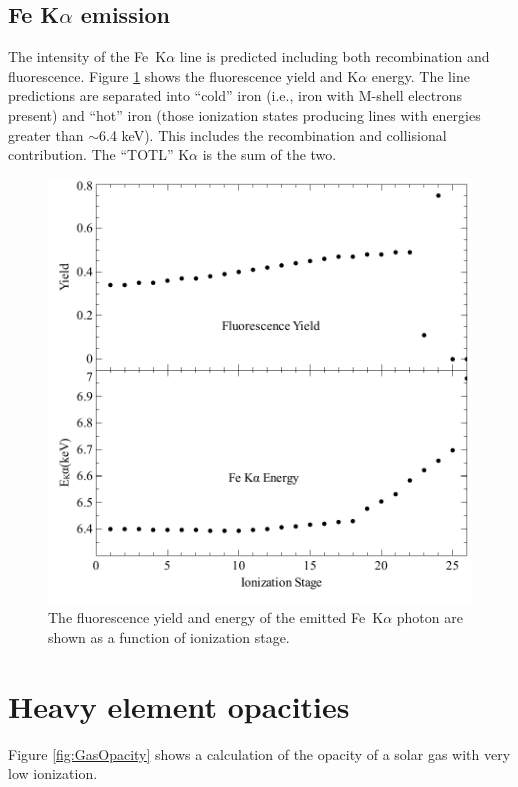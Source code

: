 \subsection{Fe K$\alpha$ emission}

The intensity of the Fe~K$\alpha$ line is predicted including both recombination
and fluorescence.  Figure \ref{fig:FeKalpha} shows the fluorescence yield and
K$\alpha$ energy.
The line predictions are separated into ``cold'' iron (i.e., iron with
M-shell electrons present) and ``hot'' iron (those ionization states
producing lines with energies greater than $\sim$6.4 keV).  This includes the
recombination and collisional contribution.  The ``TOTL'' K$\alpha$ is the sum of
the two.

\begin{figure}
\centering
\label{fig:FeKalpha}
\includegraphics[scale=0.8]{FeKalpha}
\caption[Fe~K$\alpha$ yield and energy]{The fluorescence yield and energy of the emitted Fe~K$\alpha$ photon
are shown as a function of ionization stage.}
\end{figure}

\section{Heavy element opacities}

Figure \ref{fig:GasOpacity} shows a calculation of the opacity of a solar gas with very
low ionization.

